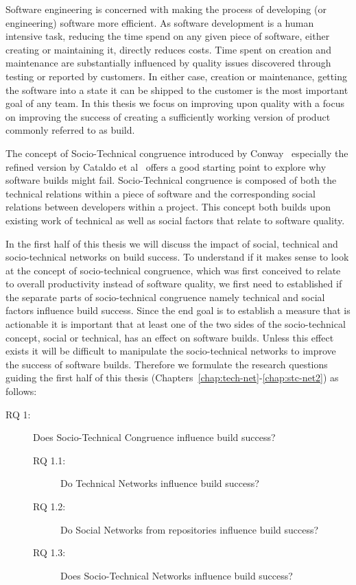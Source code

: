 Software engineering is concerned with making the process of developing (or engineering) software more efficient.
As software development is a human intensive task, reducing the time spend on any given piece of software, either creating or maintaining it, directly reduces costs.
Time spent on creation and maintenance are substantially influenced by quality issues discovered through testing or reported by customers.
In either case, creation or maintenance, getting the software into a state it can be shipped to the customer is the most important goal of any team.
In this thesis we focus on improving upon quality with a focus on improving the success of creating a sufficiently working version of product commonly referred to as build.

The concept of Socio-Technical congruence introduced by Conway~\cite{conway:datamination:1968} especially the refined version by Cataldo et al~\cite{cataldo:cscw:2006} offers a good starting point to explore why software builds might fail.
Socio-Technical congruence is composed of both the technical relations within a piece of software and the corresponding social relations between developers within a project.
This concept both builds upon existing work of technical as well as social factors that relate to software quality.

In the first half of this thesis we will discuss the impact of social, technical and socio-technical networks on build success.
To understand if it makes sense to look at the concept of socio-technical congruence, which was first conceived to relate to overall productivity instead of software quality, we first need to established if the separate parts of socio-technical congruence namely technical and social factors influence build success.
Since the end goal is to establish a measure that is actionable it is important that at least one of the two sides of the socio-technical concept, social or technical, has an effect on software builds.
Unless this effect exists it will be difficult to manipulate the socio-technical networks to improve the success of software builds.
Therefore we formulate the research questions guiding the first half of this thesis (Chapters~\ref{chap:tech-net}-\ref{chap:stc-net2}) as follows:

\begin{description}
% 
\item[RQ 1:] Does Socio-Technical Congruence influence build success?
  \begin{description}
  \item[RQ 1.1:] Do Technical Networks influence build success?
  \item[RQ 1.2:] Do Social Networks from repositories influence build success?
  \item[RQ 1.3:] Does Socio-Technical Networks influence build success?
  \end{description}
%
\end{description}

